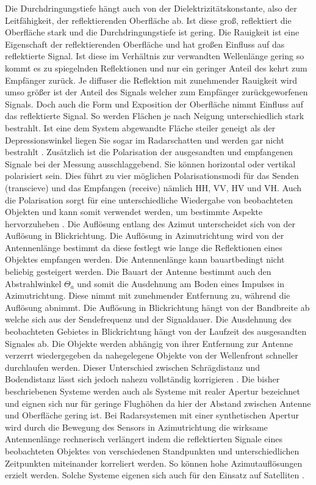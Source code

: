 Die Durchdringungstiefe hängt auch von der Dielektrizitätskonstante, also der Leitfähigkeit, der reflektierenden Oberfläche ab. Ist diese groß, reflektiert die Oberfläche stark und die 
Durchdringungstiefe ist gering. Die Rauigkeit ist eine Eigenschaft der reflektierenden Oberfläche und hat großen Einfluss auf das reflektierte Signal. Ist diese im Verhältnis
zur verwandten Wellenlänge gering so kommt es zu spiegelnden Reflektionen und nur ein geringer Anteil des kehrt zum Empfänger zurück. Je diffuser
die Reflektion mit zunehmender Rauigkeit wird umso größer ist der Anteil des Signals welcher zum Empfänger zurückgeworfenen Signals. Doch auch die Form und Exposition der Oberfläche 
nimmt Einfluss auf das reflektierte Signal. So werden Flächen je nach Neigung unterschiedlich stark bestrahlt. Ist eine dem System abgewandte Fläche steiler geneigt als der Depressionswinkel 
liegen Sie sogar im Radarschatten und werden gar nicht bestrahlt \cite{einfuehrung_in_fernerkundung}. 
Zusätzlich ist die Polarisation der ausgesandten und empfangenen Signale bei der Messung ausschlaggebend. Sie können horizontal oder 
vertikal polarisiert sein. Dies führt zu vier möglichen Polarisationsmodi für das Senden (transcieve) und das Empfangen (receive) nämlich HH, VV, HV und VH. Auch die 
Polarisation sorgt für eine unterschiedliche Wiedergabe von beobachteten Objekten und kann somit verwendet werden, um bestimmte Aspekte hervorzuheben
 \cite{einfuehrung_in_fernerkundung}. Die Auflösung entlang des Azimut unterscheidet sich von der Auflösung in Blickrichtung. Die Auflösung in Azimutrichtung wird von 
der Antennenlänge bestimmt da diese festlegt wie lange die Reflektionen eines Objektes empfangen werden. Die Antennenlänge kann bauartbedingt nicht beliebig gesteigert werden.
Die Bauart der Antenne bestimmt auch den Abstrahlwinkel $\Theta_a$ und somit die Ausdehnung am Boden eines Impulses in Azimutrichtung. Diese nimmt mit zunehmender Entfernung
zu, während die Auflösung abnimmt.
Die Auflösung in Blickrichtung hängt von der Bandbreite ab welche sich aus der Sendefrequenz und der Signaldauer. Die Ausdehnung des beobachteten Gebietes 
in Blickrichtung hängt von der Laufzeit des ausgesandten Signales ab. Die Objekte werden abhängig von ihrer Entfernung zur Antenne verzerrt wiedergegeben da nahegelegene 
Objekte von der Wellenfront schneller durchlaufen werden. Dieser Unterschied zwischen Schrägdistanz und Bodendistanz lässt sich jedoch nahezu vollständig korrigieren 
\cite{einfuehrung_in_fernerkundung}. Die bisher beschriebenen Systeme werden auch als Systeme mit realer Apertur bezeichnet und eignen sich nur für geringe Flughöhen da hier 
der Abstand zwischen Antenne und Oberfläche gering ist. Bei Radarsystemen mit einer synthetischen Apertur wird durch die Bewegung des Sensors in Azimutrichtung die 
wirksame Antennenlänge rechnerisch verlängert indem die reflektierten Signale eines beobachteten Objektes von verschiedenen Standpunkten und unterschiedlichen Zeitpunkten 
miteinander korreliert werden. So können hohe Azimutauflösungen erzielt werden. Solche Systeme eigenen sich auch für den Einsatz auf Satelliten \cite{einfuehrung_in_fernerkundung}. 

